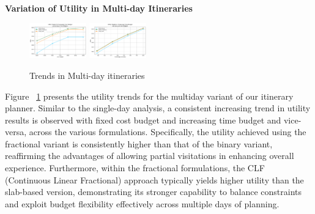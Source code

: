 \newpage
\noindent\textbf{Variation of Utility in Multi-day Itineraries}

\begin{figure}[H]
\includegraphics[width=0.22\textwidth]{plots/multiday1.png}
\includegraphics[width=0.22\textwidth]{plots/multiday2.png}
\caption{Trends in Multi-day itineraries}
\label{fig:util_md}
\end{figure}

Figure ~\ref{fig:util_md} presents the utility trends for the multiday variant of our itinerary planner. Similar to the single-day analysis, a consistent increasing trend in utility results is observed with fixed cost budget and increasing time budget and vice-versa, across the various formulations. Specifically, the utility achieved using the fractional variant is consistently higher than that of the binary variant, reaffirming the advantages of allowing partial visitations in enhancing overall experience. Furthermore, within the fractional formulations, the CLF (Continuous Linear Fractional) approach typically yields higher utility than the slab-based version, demonstrating its stronger capability to balance constraints and exploit budget flexibility effectively across multiple days of planning.\\

